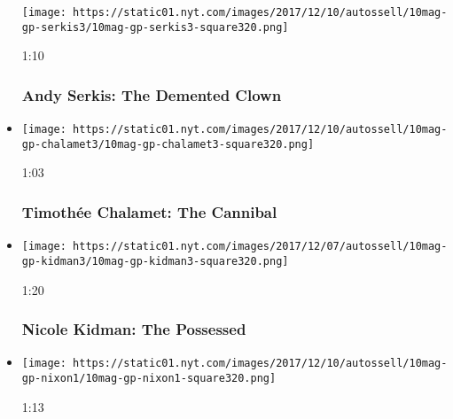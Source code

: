 \begin{itemize}
  \texttt{[image: https://static01.nyt.com/images/2017/12/10/autossell/10mag-gp-serkis3/10mag-gp-serkis3-square320.png]}

  1:10

  \hypertarget{andy-serkis-the-demented-clown}{%
  \subsubsection{Andy Serkis: The Demented
  Clown}\label{andy-serkis-the-demented-clown}}
\item
  \href{https://www.nytimes.com/video/magazine/100000005588864/timothee-chalamet-the-cannibal.html?action=click\&module=video-series-bar\&region=header\&pgtype=Article\&playlistId=video/magazine}{}

  \texttt{[image: https://static01.nyt.com/images/2017/12/10/autossell/10mag-gp-chalamet3/10mag-gp-chalamet3-square320.png]}

  1:03

  \hypertarget{timotheux301e-chalamet-the-cannibal}{%
  \subsubsection{Timothée Chalamet: The
  Cannibal}\label{timotheux301e-chalamet-the-cannibal}}
\item
  \href{https://www.nytimes.com/video/magazine/100000005588835/nicole-kidman-the-possessed.html?action=click\&module=video-series-bar\&region=header\&pgtype=Article\&playlistId=video/magazine}{}

  \texttt{[image: https://static01.nyt.com/images/2017/12/07/autossell/10mag-gp-kidman3/10mag-gp-kidman3-square320.png]}

  1:20

  \hypertarget{nicole-kidman-the-possessed}{%
  \subsubsection{Nicole Kidman: The
  Possessed}\label{nicole-kidman-the-possessed}}
\item
  \href{https://www.nytimes.com/video/magazine/100000005588895/cynthia-nixon-the-ghost-bride.html?action=click\&module=video-series-bar\&region=header\&pgtype=Article\&playlistId=video/magazine}{}

  \texttt{[image: https://static01.nyt.com/images/2017/12/10/autossell/10mag-gp-nixon1/10mag-gp-nixon1-square320.png]}

  1:13

  \hypertarget{cynthia-nixon-the-ghost-bride}{%
}
\end{itemize}
